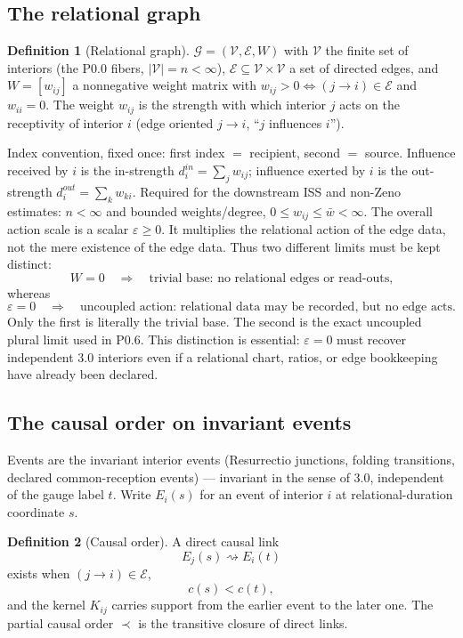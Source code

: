 \documentclass[11pt,a4paper]{article}
\def\mathfrak#1{#1}%
\def\mathrm#1{#1}%
\def\emph#1{#1}%
\theoremstyle{definition}
\newtheorem{definition}{Definition}[section]
\theoremstyle{plain}
\theoremstyle{remark}
\begin{document}
\subsection{The relational graph}

\begin{definition}[Relational graph]
$\mathcal G=(\mathcal V,\mathcal E,W)$ with $\mathcal V$ the finite set of interiors
(the P0.0 fibers, $|\mathcal V|=n<\infty$), $\mathcal E\subseteq\mathcal V\times\mathcal V$
a set of directed edges, and $W=[w_{ij}]$ a nonnegative weight matrix with
$w_{ij}>0\iff(j\!\to\!i)\in\mathcal E$ and $w_{ii}=0$. The weight $w_{ij}$ is the
strength with which interior $j$ acts on the receptivity of interior $i$ (edge
oriented $j\!\to\!i$, ``$j$ influences $i$'').
\end{definition}

Index convention, fixed once: \emph{first index $=$ recipient, second $=$ source}.
Influence \emph{received} by $i$ is the in-strength $d_i^{\mathrm{in}}=\sum_j w_{ij}$;
influence \emph{exerted} by $i$ is the out-strength $d_i^{\mathrm{out}}=\sum_k w_{ki}$.
Required for the downstream ISS and non-Zeno estimates: $n<\infty$ and bounded
weights/degree, $0\le w_{ij}\le\bar w<\infty$. The overall action scale is a scalar
\(\varepsilon\ge0\). It multiplies the relational \emph{action} of the edge data, not
the mere existence of the edge data. Thus two different limits must be kept distinct:
\[
W=0
\quad\Longrightarrow\quad
\text{trivial base: no relational edges or read-outs,}
\]
whereas
\[
\varepsilon=0
\quad\Longrightarrow\quad
\text{uncoupled action: relational data may be recorded, but no edge acts.}
\]
Only the first is literally the trivial base. The second is the exact uncoupled
plural limit used in P0.6. This distinction is essential: \(\varepsilon=0\) must
recover independent 3.0 interiors even if a relational chart, ratios, or edge
bookkeeping have already been declared.

\subsection{The causal order on invariant events}

Events are the \emph{invariant} interior events (Resurrectio junctions, folding
transitions, declared common-reception events) --- invariant in the sense of 3.0,
independent of the gauge label $t$. Write $E_i(s)$ for an event of interior $i$ at
relational-duration coordinate $s$.

\begin{definition}[Causal order]
A direct causal link
\[
E_j(s)\rightsquigarrow E_i(t)
\]
exists when $(j\!\to\!i)\in\mathcal E$,
\[
\mathfrak c(s)<\mathfrak c(t),
\]
and the kernel $K_{ij}$ carries support from the earlier event to the later one.
The partial causal order $\prec$ is the transitive closure of direct links.
\end{definition}
\end{document}
